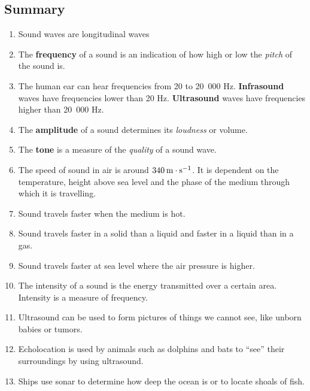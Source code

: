             \subsection{ Summary}
            \nopagebreak
      \label{m38800*id185628}\begin{enumerate}[noitemsep, label=\textbf{\arabic*}. ] 
            \label{m38800*uid14}\item Sound waves are longitudinal waves
\label{m38800*uid15}\item The \textbf{frequency} of a sound is an indication of how high or low the \textsl{pitch} of the sound is.
\label{m38800*uid16}\item The human ear can hear frequencies from 20 to 20~000 Hz.
\textbf{Infrasound} waves have frequencies lower than 20 Hz.
\textbf{Ultrasound} waves have frequencies higher than 20~000 Hz.
\label{m38800*uid17}\item The \textbf{amplitude} of a sound determines its \textsl{loudness} or volume.
\label{m38800*uid18}\item The \textbf{tone} is a measure of the \textsl{quality} of a sound wave.
\label{m38800*uid19}\item The speed of sound in air is around $340\phantom{\rule{2pt}{0ex}}\mathrm{m}\ensuremath{\cdot}\mathrm{s}{}^{-1}$. It is dependent on the temperature, height above sea level and the phase of the medium through which it is travelling.
\label{m38800*uid20}\item Sound travels faster when the medium is hot.
\label{m38800*uid21}\item Sound travels faster in a solid than a liquid and faster in a liquid than in a gas.
\label{m38800*uid22}\item Sound travels faster at sea level where the air pressure is higher.
\label{m38800*uid23}\item The intensity of a sound is the energy transmitted over a certain area. Intensity is a measure of frequency.
\label{m38800*uid24}\item Ultrasound can be used to form pictures of things we cannot see, like unborn babies or tumors.
\label{m38800*uid25}\item Echolocation is used by animals such as dolphins and bats to ``see'' their surroundings by using ultrasound.
\label{m38800*uid26}\item Ships use sonar to determine how deep the ocean is or to locate shoals of fish.
\end{enumerate}
    \label{m38800*cid9}

